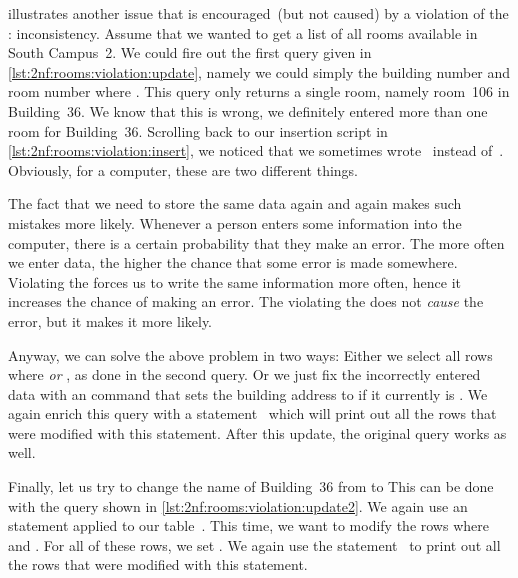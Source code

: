  illustrates another issue that is encouraged~(but not caused) by a violation of the : inconsistency.
Assume that we wanted to get a list of all rooms available in South Campus~2.
We could fire out the first query given in \cref{lst:2nf:rooms:violation:update}, namely we could simply  the building number and room number where .
This query only returns a single room, namely room~106 in Building~36.
We know that this is wrong, we definitely entered more than one room for Building~36.
Scrolling back to our insertion script in \cref{lst:2nf:rooms:violation:insert}, we noticed that we sometimes wrote~ instead of~.
Obviously, for a computer, these are two different things.

The fact that we need to store the same data again and again makes such mistakes more likely.
Whenever a person enters some information into the computer, there is a certain probability that they make an error.
The more often we enter data, the higher the chance that some error is made somewhere.
Violating the  forces us to write the same information more often, hence it increases the chance of making an error.
The violating the  does not \emph{cause} the error, but it makes it more likely.%
%
\begin{sloppypar}%
Anyway, we can solve the above problem in two ways:
Either we select all rows where  \emph{or} , as done in the second query.
Or we just fix the incorrectly entered data with an  command that sets the building address to  if it currently is .
We again enrich this query with a  statement~\cite{PGDG:PD:RDFMR} which will print out all the rows that were modified with this statement.
After this update, the original query works as well.%
\end{sloppypar}%
%
Finally, let us try to change the name of Building~36 from  to 
This can be done with the query shown in \cref{lst:2nf:rooms:violation:update2}.
We again use an  statement applied to our table~.
This time, we want to modify the rows where  and .
For all of these rows, we set .
We again use the  statement~\cite{PGDG:PD:RDFMR} to print out all the rows that were modified with this statement.

